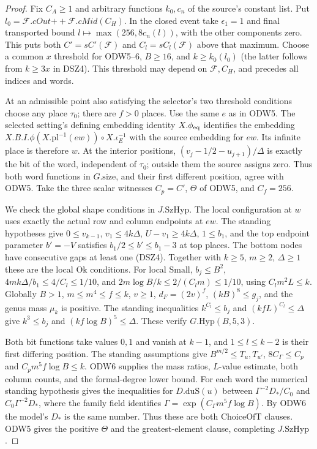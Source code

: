 \begin{proof}
Fix $C_A\ge1$ and arbitrary functions $k_0,c_n$ of the source's
constant list. Put $l_0=\mathcal F.cOut\mathbin{+\!+}
\mathcal F.cMid(C_H)$. In the closed event take $\epsilon_1=1$
and final transported bound $l\mapsto\max(256,8c_n(l))$, with
the other components zero. This puts both $C'=sC'(\mathcal F)$
and $C_l=sC_l(\mathcal F)$ above that maximum. Choose a common
$x$ threshold for ODW5--6, $B\ge16$, and $k\ge k_0(l_0)$
(the latter follows from $k\ge3x$ in DSZ4). This threshold may
depend on $\mathcal F,C_H$, and precedes all indices and words.

At an admissible point also satisfying the selector's two threshold
conditions choose any place $\tau_0$; there are $f>0$ places.
Use the same $e$ as in ODW5. The selected setting's defining
embedding identity $X.\phi_{\rm eq}$ identifies the embedding
$X.B.I.\phi(X.\mathrm{pl}^{-1}(ew))\circ X.\iota_E^{-1}$
with the source embedding for $ew$. Its infinite place is therefore
$w$. At the interior positions,
$(v_j-1/2-u_{j+1})/\Delta$ is exactly the bit of the word,
independent of $\tau_0$; outside them the source assigns zero.
Thus both word functions in $G.\mathrm{size}$, and their first
different position, agree with ODW5. Take the three scalar witnesses
$C_p=C'$, $\Theta$ of ODW5, and $C_f=256$.

We check the global shape conditions in $J.\mathrm{SzHyp}$.
The local configuration at $w$ uses exactly the actual row and
column endpoints at $ew$. The standing hypotheses give
$0\le v_{k-1}$, $v_1\le4k\Delta$, $U-v_1\ge4k\Delta$,
$1\le b_1$, and the top endpoint parameter
$b'=-V$ satisfies $b_1/2\le b'\le b_1-3$ at top places.
The bottom nodes have consecutive gaps at least one (DSZ4).
Together with $k\ge5$, $m\ge2$, $\Delta\ge1$ these are the
local $\mathrm{Ok}$ conditions. For local $\mathrm{Small}$,
$b_j\le B^2$, $4mk\Delta/b_1\le4/C_l\le1/10$, and
$2m\log B/k\le2/(C_lm)\le1/10$, using
$C_l m^2L\le k$. Globally $B>1$, $m\le m^4\le f\le k$,
$v\ge1$, $d_F=(2v)^f$, $(kB)^8\le g_j$, and the genus mass
$\mu_k$ is positive. The standing inequalities
$k^{C_l}\le b_j$ and $(kfL)^{C_l}\le\Delta$ give
$k^3\le b_j$ and $(kf\log B)^5\le\Delta$.
These verify $G.\mathrm{Hyp}(B,5,3)$.

Both bit functions take values $0,1$ and vanish at $k-1$,
and $1\le l\le k-2$ is their first differing position.
The standing assumptions give $B^{m/2}\le T_u,T_{u'}$,
$8C_\Gamma\le C_p$ and $C_pm^5 f\log B\le k$. ODW6 supplies
the mass ratios, $L$-value estimate, both column counts, and the
formal-degree lower bound. For each word the numerical standing
hypothesis gives the inequalities for
$D.\mathrm{duS}(u)$ between
$\Gamma^{-2}D_*/C_0$ and $C_0\Gamma^{-2}D_*$,
where the family field identifies
$\Gamma=\exp(C_\Gamma m^5 f\log B)$.
By ODW6 the model's $D_*$ is the same number. Thus these are
both $\mathrm{ChoiceOfT}$ clauses. ODW5 gives the positive
$\Theta$ and the greatest-element clause, completing
$J.\mathrm{SzHyp}$.


\end{proof}
